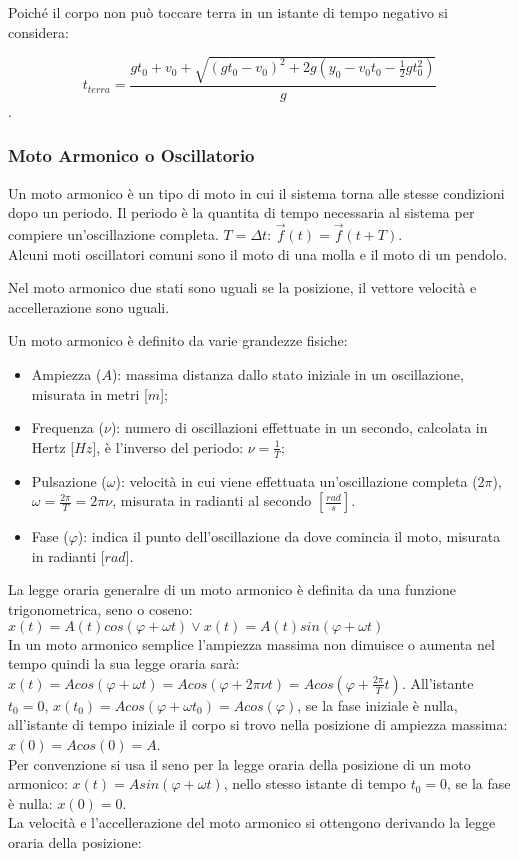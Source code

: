 \documentclass{article}
\numberwithin{equation}{subsection}
\begin{document}
Poiché il corpo non può toccare terra in un istante di tempo 
negativo si considera:

\begin{equation}
    t_{terra} = \displaystyle\frac{gt_0+v_0 +\sqrt{(gt_0-v_0)^{2}+2g\left(y_0-v_0t_0-\displaystyle\frac{1}{2}gt_0^{2}\right)}}{g}
\end{equation}.

\subsubsection{Moto Armonico o Oscillatorio}
Un moto armonico è un tipo di moto in cui il sistema torna 
alle stesse condizioni dopo un periodo.
Il periodo è la quantita di tempo necessaria 
al sistema per compiere un'oscillazione completa.
$T = \Delta t$: $\vec{f}(t) = \vec{f}(t + T)$.\\

Alcuni moti oscillatori comuni sono il moto di una molla e il 
moto di un pendolo.

Nel moto armonico due stati sono uguali se la posizione, 
il vettore velocità e accellerazione sono uguali.

Un moto armonico è definito da varie grandezze fisiche:

\begin{itemize}
    \item Ampiezza ($A$): massima distanza dallo stato iniziale 
    in un oscillazione, misurata in metri [$m$];
    \item Frequenza ($\nu$): numero di oscillazioni effettuate 
    in un secondo, calcolata in Hertz [$Hz$], è l'inverso del 
    periodo: $\nu = \displaystyle\frac{1}{T}$;
    \item Pulsazione ($\omega$): velocità in cui viene 
    effettuata un'oscillazione completa ($2\pi$), $\omega = \displaystyle\frac{2\pi}{T} = 2\pi\nu$, 
    misurata in radianti al secondo $\left[\displaystyle\frac{rad}{s}\right]$.
    \item Fase ($\varphi$): indica il punto dell'oscillazione 
    da dove comincia il moto, misurata in radianti [$rad$].
\end{itemize}

La legge oraria generalre di un moto armonico è definita da 
una funzione trigonometrica, seno o coseno: $x(t) = A(t)cos(\varphi+\omega t) 
\lor x(t) = A(t)sin(\varphi+\omega t)$\\ 
In un moto armonico semplice l'ampiezza massima non dimuisce o 
aumenta nel tempo quindi la sua legge oraria sarà:  
$x(t) = Acos(\varphi + \omega t) =Acos(\varphi + 
2\pi\nu t) = Acos(\varphi + \displaystyle\frac{2\pi}{T}t)$.
All'istante $t_0 = 0$, $x(t_0) = Acos(\varphi + \omega t_0) = 
Acos(\varphi)$, se la fase iniziale è nulla, all'istante di 
tempo iniziale il corpo si trovo nella posizione 
di ampiezza massima: $x(0) = Acos(0) = A$.\\
Per convenzione si usa il seno per la legge oraria della posizione 
di un moto armonico: $x(t) = Asin(\varphi + \omega t)$, nello 
stesso istante di tempo $t_0 = 0$, se la fase è nulla: $x(0) = 0$.\\
La velocità e l'accellerazione del moto armonico si ottengono 
derivando la legge oraria della posizione:
\end{document}
